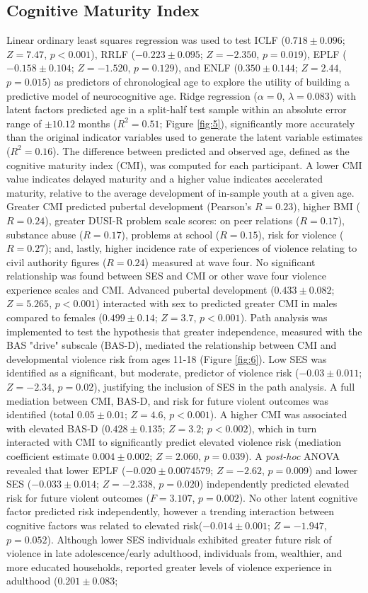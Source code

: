 \documentclass[utf8]{frontiersSCNS} %
\begin{document}
\subsection{Cognitive Maturity Index} Linear ordinary least squares regression was used to test ICLF ($0.718\pm0.096$; $Z=7.47$, $p<0.001$), RRLF ($-0.223\pm0.095$; $Z=-2.350$, $p = 0.019$), EPLF ($-0.158\pm0.104$; $Z=-1.520$, $p=0.129$), and ENLF ($0.350\pm0.144$; $Z=2.44$, $p=0.015$) as predictors of chronological age to explore the utility of building a predictive model of neurocognitive age. Ridge regression ($\alpha = 0$, $\lambda = 0.083$) with latent factors predicted age in a split-half test sample within an absolute error range of $\pm 10.12$ months ($R^2=0.51$; Figure \ref{fig:5}), significantly more accurately than the original indicator variables used to generate the latent variable estimates ($R^2=0.16$). The difference between predicted and observed age,  defined as the cognitive maturity index (CMI), was computed for each participant. A lower CMI value indicates delayed maturity and a higher value indicates accelerated maturity, relative to the average development of in-sample youth at a given age. Greater CMI predicted pubertal development (Pearson's $R=0.23$), higher BMI ($R=0.24$), greater DUSI-R problem scale scores: on peer relations ($R=0.17$), substance abuse ($R=0.17$), problems at school ($R=0.15$), risk for violence ($R=0.27$); and, lastly, higher incidence rate of experiences of violence relating to civil authority figures ($R=0.24$) measured at wave four. No significant relationship was found between SES and CMI or other wave four violence experience scales and CMI. Advanced pubertal development ($0.433\pm0.082$; $Z=5.265$, $p<0.001$) interacted with sex to predicted greater CMI in males compared to females ($0.499\pm0.14$; $Z=3.7$, $p<0.001$). Path analysis was implemented to test the hypothesis that greater independence, measured with the BAS "drive" subscale (BAS-D), mediated the relationship between CMI and developmental violence risk from ages 11-18 (Figure \ref{fig:6}). Low SES was identified as a significant, but moderate, predictor of violence risk ($-0.03\pm0.011$; $Z=-2.34$, $p=0.02$), justifying the inclusion of SES in the path analysis. A full mediation between CMI, BAS-D, and risk for future violent outcomes was identified (total $0.05\pm0.01$; $Z=4.6$, $p<0.001$). A higher CMI was associated with elevated BAS-D ($0.428\pm0.135$; $Z=3.2$; $p<0.002$), which in turn interacted with CMI to significantly predict elevated violence risk (mediation coefficient estimate $0.004\pm0.002$; $Z=2.060$, $p=0.039$). A \textit{post-hoc} ANOVA revealed that lower EPLF ($-0.020\pm0.0074579$; $Z=-2.62$, $p=0.009$) and lower SES ($-0.033\pm0.014$;  $Z=-2.338$,  $p=0.020$) independently predicted elevated risk for future violent outcomes ($F=3.107$, $p=0.002$). No other latent cognitive factor predicted risk independently, however a trending interaction between cognitive factors was related to elevated risk($-0.014\pm0.001$; $Z=-1.947$,  $p=0.052$). Although lower SES individuals exhibited greater future risk of violence in late adolescence/early adulthood, individuals from, wealthier, and more educated households, reported greater levels of violence experience in adulthood ($0.201\pm0.083$; 
\end{document}
